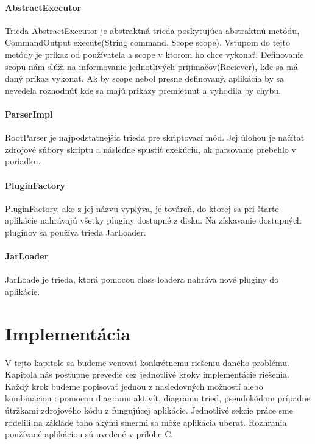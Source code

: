 \paragraph{AbstractExecutor}
Trieda AbstractExecutor je abstraktná trieda poskytujúca abstraktnú metódu,  CommandOutput execute(String command, Scope scope). Vstupom do tejto metódy je príkaz od používateľa a scope v ktorom ho chce vykonať. Definovanie scopu nám slúži na informovanie jednotlivých prijímačov(Reciever), kde sa má daný príkaz vykonať. Ak by scope nebol presne definovaný, aplikácia by sa nevedela rozhodnúť kde sa majú príkazy premietnuť a vyhodila by chybu.
\paragraph{ParserImpl}
RootParser je najpodstatnejšia trieda pre skriptovací mód. Jej úlohou je načítať zdrojové súbory skriptu a následne spustiť exekúciu, ak parsovanie prebehlo v poriadku.
\paragraph{PluginFactory}
PluginFactory, ako z jej názvu vyplýva, je továreň, do ktorej sa pri štarte aplikácie nahrávajú všetky pluginy dostupné z disku. Na získavanie dostupných pluginov sa používa trieda JarLoader. 
\paragraph{JarLoader}
JarLoade je trieda, ktorá pomocou class loadera nahráva nové pluginy do aplikácie.
\section{Implementácia}
\indent V tejto kapitole sa budeme venovať konkrétnemu riešeniu daného problému. Kapitola nás postupne prevedie cez jednotlivé kroky implementácie riešenia. Každý krok budeme popisovať jednou z nasledovných možností alebo kombináciou : pomocou diagramu aktivít, diagramu tried, pseudokódom prípadne útržkami zdrojového kódu z fungujúcej aplikácie. Jednotlivé sekcie práce sme rodelili na základe toho akými smermi sa môže aplikácia uberať. Rozhrania používané aplikáciou sú uvedené v prílohe C.
